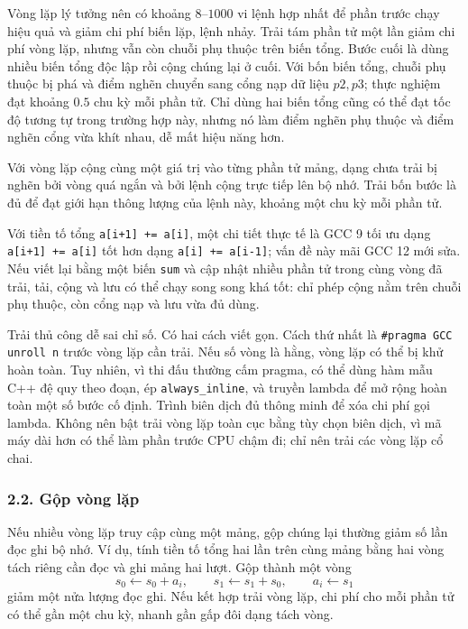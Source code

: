 \documentclass[11pt]{article}
\begin{document}
Vòng lặp lý tưởng nên có khoảng \(8\)--\(1000\) vi lệnh hợp nhất để phần trước
chạy hiệu quả và giảm chi phí biến lặp, lệnh nhảy. Trải tám phần tử một lần
giảm chi phí vòng lặp, nhưng vẫn còn chuỗi phụ thuộc trên biến tổng. Bước cuối
là dùng nhiều biến tổng độc lập rồi cộng chúng lại ở cuối. Với bốn biến tổng,
chuỗi phụ thuộc bị phá và điểm nghẽn chuyển sang cổng nạp dữ liệu \(p2,p3\);
thực nghiệm đạt khoảng \(0.5\) chu kỳ mỗi phần tử. Chỉ dùng hai biến tổng cũng
có thể đạt tốc độ tương tự trong trường hợp này, nhưng nó làm điểm nghẽn phụ
thuộc và điểm nghẽn cổng vừa khít nhau, dễ mất hiệu năng hơn.

Với vòng lặp cộng cùng một giá trị vào từng phần tử mảng, dạng chưa trải bị
nghẽn bởi vòng quá ngắn và bởi lệnh cộng trực tiếp lên bộ nhớ. Trải bốn bước là
đủ để đạt giới hạn thông lượng của lệnh này, khoảng một chu kỳ mỗi phần tử.

Với tiền tố tổng \texttt{a[i+1] += a[i]}, một chi tiết thực tế là GCC 9 tối ưu
dạng \texttt{a[i+1] += a[i]} tốt hơn dạng \texttt{a[i] += a[i-1]}; vấn đề này
mãi GCC 12 mới sửa. Nếu viết lại bằng một biến \texttt{sum} và cập nhật nhiều
phần tử trong cùng vòng đã trải, tải, cộng và lưu có thể chạy song song khá
tốt: chỉ phép cộng nằm trên chuỗi phụ thuộc, còn cổng nạp và lưu vừa đủ dùng.

Trải thủ công dễ sai chỉ số. Có hai cách viết gọn. Cách thứ nhất là
\texttt{\#pragma GCC unroll n} trước vòng lặp cần trải. Nếu số vòng là hằng,
vòng lặp có thể bị khử hoàn toàn. Tuy nhiên, vì thi đấu thường cấm pragma, có
thể dùng hàm mẫu C++ đệ quy theo đoạn, ép \texttt{always\_inline}, và truyền
lambda để mở rộng hoàn toàn một số bước cố định. Trình biên dịch đủ thông minh
để xóa chi phí gọi lambda. Không nên bật trải vòng lặp toàn cục bằng tùy chọn
biên dịch, vì mã máy dài hơn có thể làm phần trước CPU chậm đi; chỉ nên trải
các vòng lặp cổ chai.

\subsubsection*{2.2. Gộp vòng lặp}

Nếu nhiều vòng lặp truy cập cùng một mảng, gộp chúng lại thường giảm số lần đọc
ghi bộ nhớ. Ví dụ, tính tiền tố tổng hai lần trên cùng mảng bằng hai vòng tách
riêng cần đọc và ghi mảng hai lượt. Gộp thành một vòng
\[
  s_0 \gets s_0+a_i,\qquad s_1 \gets s_1+s_0,\qquad a_i \gets s_1
\]
giảm một nửa lượng đọc ghi. Nếu kết hợp trải vòng lặp, chi phí cho mỗi phần tử
có thể gần một chu kỳ, nhanh gần gấp đôi dạng tách vòng.
\end{document}
